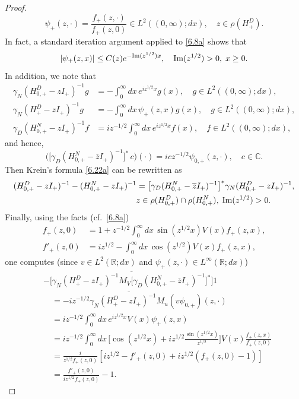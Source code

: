 \documentclass[reqno,10pt, centertags]{amsart}
\newcommand{\bbR}{{\mathbb{R}}}
\newcommand{\bbC}{{\mathbb{C}}}
\newcommand{\no}{\nonumber}
\newcommand{\lb}{\label}
\newcommand{\f}{\frac}
\newcommand{\ol}{\overline}
\newcommand{\ga}{\gamma}
\renewcommand{\Im}{\text{\rm Im}}
\numberwithin{equation}{section}
\theoremstyle{definition}
\begin{document}
\begin{proof}
\begin{equation}
\psi_+(z,\cdot)=\f{f_+(z,\cdot)}{f_+(z,0)} \in L^2((0,\infty);dx), \quad
z\in\rho(H^D_+).
\end{equation}
In fact, a standard iteration argument applied to \eqref{6.8a} shows that
\begin{equation}
|\psi_+(z,x)|\leq C(z) e^{-\Im(z^{1/2})x}, \quad 
\Im(z^{1/2})> 0, \; x\geq 0.
\end{equation}
In addition, we note that
\begin{align}
\gamma_N(H^D_{0,+} -zI_+)^{-1} g &= -\int_0^\infty dx \,
e^{i z^{1/2}x} g(x), \quad g\in L^2((0,\infty);dx),
\\
\ga_N(H_+^D-zI_+)^{-1}g &= -\int_0^\infty dx\, \psi_+(z,x)g(x), \quad
g\in L^2((0,\infty);dx),
\\
\gamma_D(H^N_{0,+} -zI_+)^{-1} f &= i z^{-1/2}\int_0^\infty dx\,
e^{i z^{1/2}x} f(x), \quad f\in L^2((0,\infty);dx),
\end{align}
and hence,
\begin{equation}
\big(\big[\ga_D(H^N_{0,+}-\ol{z}I_+)^{-1}\big]^* \,
c\big)(\cdot)=ic z^{-1/2}\psi_{0,+}(z,\cdot), \quad c\in\bbC.
\end{equation}
Then Krein's formula \eqref{6.22a}  can be rewritten as
\begin{align}
&(H^D_{0,+} -zI_+)^{-1}-(H^N_{0,+} -zI_+)^{-1}=
\big[\ga_D(H^N_{0,+}-\ol{z}I_+)^{-1}\big]^* \gamma_N(H^D_{0,+}
-zI_+)^{-1},
\no  \\
& \hspace*{5.2cm}  z\in\rho(H^D_{0,+})\cap\rho(H^N_{0,+}), \;
\Im(z^{1/2})>0.   \lb{6.27a}
\end{align}
Finally, using the facts (cf.\ \eqref{6.8a})
\begin{align}
f_+(z,0)&=1+ z^{-1/2}
\int_0^\infty dx \, \sin(z^{1/2}x) V(x) f_+(z,x),  \\
f'_+(z,0)&=i z^{1/2}- \int_0^\infty dx\, \cos(z^{1/2}) V(x) f_+(z,x),
\end{align}
one computes (since $v\in L^2(\bbR;dx)$ and $\psi_+(z,\cdot)\in
L^\infty(\bbR;dx)$)
\begin{align}
&-\big[\ol{\gamma_N (H^D_{+} -zI_+)^{-1} M_V
\big[\ga_D(H^N_{0,+}-\ol{z}I_+)^{-1}\big]^*}\big] 1
\no \\
& \quad = -i z^{-1/2}\ol{\gamma_N (H^D_{+} -zI_+)^{-1} M_u} (v
\psi_{0,+})(z,\cdot)  \no \\
& \quad = i z^{-1/2} \int_0^\infty dx \, e^{i z^{1/2}x} V(x)
\psi_+(z,x)  \no \\
& \quad = i z^{-1/2} \int_0^\infty dx \, \bigg[\cos(z^{1/2}x)
+i z^{1/2} \f{\sin(z^{1/2}x)}{z^{1/2}}\bigg] V(x)
\f{f_+(z,x)}{f_+(z,0)}  \no \\
& \quad =
\f{i}{z^{1/2} f_+(z,0)}[i z^{1/2} - f'_+(z,0) +i z^{1/2}(f_+(z,0)-1)]
\no \\
& \quad = \f{f'_+(z,0)}{i z^{1/2} f_+(z,0)} -1.
\end{align}
\end{proof}
\end{document}

